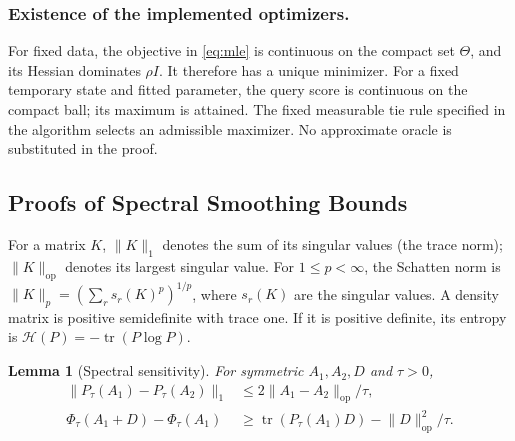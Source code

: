 \documentclass[10pt,twoside,letterpaper]{article}
\newtheorem{lemma}{Lemma}[section]
\newcommand{\tr}{\operatorname{tr}}
\newcommand{\op}{\mathrm{op}}
\newcommand{\norm}[1]{\lVert #1\rVert}
\begin{document}
\subsubsection*{Existence of the implemented optimizers.}
For fixed data, the objective in \eqref{eq:mle} is continuous on the
compact set $\Theta$, and its Hessian dominates $\rho I$. It therefore
has a unique minimizer. For a fixed temporary state and fitted
parameter, the query score is continuous on the compact ball; its
maximum is attained. The fixed measurable tie rule specified in the
algorithm selects an admissible maximizer. No approximate oracle is
substituted in the proof.

\subsection{Proofs of Spectral Smoothing Bounds}
\label{app:spectral}

For a matrix $K$, $\norm{K}_1$ denotes the sum of its singular values
(the trace norm); $\norm{K}_{\op}$ denotes its largest singular value.
For $1\le p<\infty$, the Schatten norm is
$\norm{K}_p=(\sum_r s_r(K)^p)^{1/p}$, where $s_r(K)$ are the singular
values. A density matrix is positive semidefinite with trace one.
If it is positive definite, its entropy is
$\mathcal H(P)=-\tr(P\log P)$.

\begin{lemma}[Spectral sensitivity]
\label{lem:gibbs}
For symmetric $A_1,A_2,D$ and $\tau>0$,
\begin{align}
\norm{P_\tau(A_1)-P_\tau(A_2)}_1
&\le 2\norm{A_1-A_2}_{\op}/\tau,
\label{eq:app-gibbs-lip}\\
\Phi_\tau(A_1+D)-\Phi_\tau(A_1)
&\ge\tr(P_\tau(A_1)D)-\norm{D}_{\op}^2/\tau.
\label{eq:app-potential-increment}
\end{align}
\end{lemma}
\end{document}
